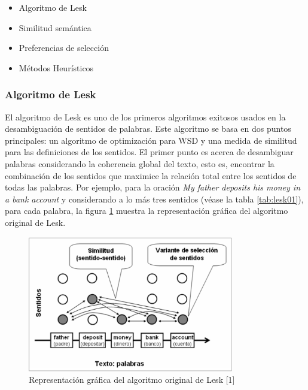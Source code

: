 \begin{itemize}
  \item Algoritmo de Lesk
  \item Similitud semántica
  \item Preferencias de selección
  \item Métodos Heurísticos
\end{itemize}

\subsubsection{Algoritmo de Lesk}
El algoritmo de Lesk \cite{002} es uno de los primeros algoritmos exitosos usados en la desambiguación de sentidos de palabras. Este algoritmo se basa en dos puntos principales: un algoritmo de optimización para WSD y una medida de similitud para las definiciones de los sentidos.
El primer punto es acerca de desambiguar palabras considerando la coherencia global del texto, esto es, encontrar la combinación de los sentidos que maximice la relación total entre los sentidos de todas las palabras.
Por ejemplo, para la oración \textit{My father deposits his money in a bank account} y considerando a lo más tres sentidos (véase la tabla \ref{tab:lesk01}), para cada palabra, la figura \ref{fig:algoritmo_lesk} muestra la representación gráfica del algoritmo original de Lesk.

  \begin{figure}[h!]
    \begin{center}
    \includegraphics[angle=0, width=9cm]{Graficos/algoritmo_lesk}
    \caption{Representación gráfica del algoritmo original de Lesk [1]}
    \label{fig:algoritmo_lesk}
    \end{center}
  \end{figure}

